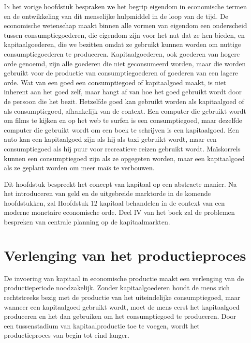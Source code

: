 \clearpage
\lettrine{I}n het vorige hoofdstuk bespraken we het begrip eigendom in economische termen en de ontwikkeling van dit menselijke hulpmiddel in de loop van de tijd. De economische wetenschap maakt binnen alle vormen van eigendom een onderscheid tussen consumptiegoederen, die eigendom zijn voor het nut dat ze hen bieden, en kapitaalgoederen, die we bezitten omdat ze gebruikt kunnen worden om nuttige consumptiegoederen te produceren. Kapitaalgoederen, ook goederen van hogere orde genoemd, zijn alle goederen die niet geconsumeerd worden, maar die worden gebruikt voor de productie van consumptiegoederen of goederen van een lagere orde. Wat van een goed een consumptiegoed of kapitaalgoed maakt, is niet inherent aan het goed zelf, maar hangt af van hoe het goed gebruikt wordt door de persoon die het bezit. Hetzelfde goed kan gebruikt worden als kapitaalgoed of als consumptiegoed, afhankelijk van de context. Een computer die gebruikt wordt om films te kijken en op het web te surfen is een consumptiegoed, maar dezelfde computer die gebruikt wordt om een boek te schrijven is een kapitaalgoed. Een auto kan een kapitaalgoed zijn als hij als taxi gebruikt wordt, maar een consumptiegoed als hij puur voor recreatieve reizen gebruikt wordt. Maïskorrels kunnen een consumptiegoed zijn als ze opgegeten worden, maar een kapitaalgoed als ze geplant worden om meer maïs te verbouwen.

Dit hoofdstuk bespreekt het concept van kapitaal op een abstracte manier. Na het introduceren van geld en de uitgebreide marktorde in de komende hoofdstukken, zal Hoofdstuk 12 kapitaal behandelen in de context van een moderne monetaire economische orde. Deel IV van het boek zal de problemen bespreken van centrale planning op de kapitaalmarkten.

\hypertarget{verlenging-van-het-productieproces}{%
\section{Verlenging van het productieproces}\label{verlenging-van-het-productieproces}}

De invoering van kapitaal in economische productie maakt een verlenging van de productieperiode noodzakelijk. Zonder kapitaalgoederen houdt de mens zich rechtstreeks bezig met de productie van het uiteindelijke consumptiegoed, maar wanneer een kapitaalgoed gebruikt wordt, moet de mens eerst het kapitaalgoed produceren en het dan gebruiken om het consumptiegoed te produceren. Door een tussenstadium van kapitaalproductie toe te voegen, wordt het productieproces van begin tot eind langer.

